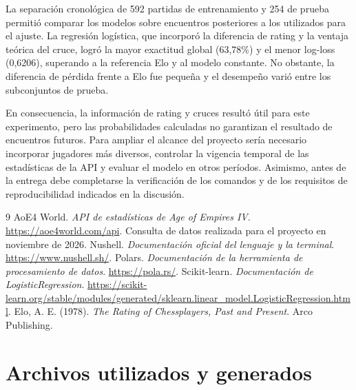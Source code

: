 \documentclass[12pt,a4paper]{article}
\begin{document}
La separación cronológica de 592 partidas de entrenamiento y 254 de prueba permitió comparar los modelos sobre encuentros posteriores a los utilizados para el ajuste. La regresión logística, que incorporó la diferencia de rating y la ventaja teórica del cruce, logró la mayor exactitud global (63,78\%) y el menor log-loss (0,6206), superando a la referencia Elo y al modelo constante. No obstante, la diferencia de pérdida frente a Elo fue pequeña y el desempeño varió entre los subconjuntos de prueba.

En consecuencia, la información de rating y cruces resultó útil para este experimento, pero las probabilidades calculadas no garantizan el resultado de encuentros futuros. Para ampliar el alcance del proyecto sería necesario incorporar jugadores más diversos, controlar la vigencia temporal de las estadísticas de la API y evaluar el modelo en otros períodos. Asimismo, antes de la entrega debe completarse la verificación de los comandos y de los requisitos de reproducibilidad indicados en la discusión.

\clearpage
\begin{thebibliography}{9}
 AoE4 World. \emph{API de estadísticas de Age of Empires IV}. \url{https://aoe4world.com/api}. Consulta de datos realizada para el proyecto en noviembre de 2026.
 Nushell. \emph{Documentación oficial del lenguaje y la terminal}. \url{https://www.nushell.sh/}.
 Polars. \emph{Documentación de la herramienta de procesamiento de datos}. \url{https://pola.rs/}.
 Scikit-learn. \emph{Documentación de LogisticRegression}. \url{https://scikit-learn.org/stable/modules/generated/sklearn.linear_model.LogisticRegression.html}.
 Elo, A. E. (1978). \emph{The Rating of Chessplayers, Past and Present}. Arco Publishing.
\end{thebibliography}

\clearpage
\appendix
\section{Archivos utilizados y generados}
\end{document}
